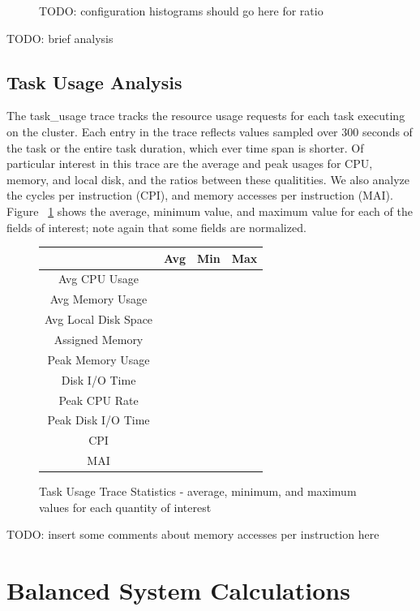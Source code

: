 \documentclass{sig-alternate}
\begin{document}
\begin{figure}
TODO: configuration histograms should go here for ratio
\end{figure}

TODO: brief analysis

\subsection{Task Usage Analysis}

The task\_usage trace tracks the resource usage requests for each task executing on the cluster.
Each entry in the trace reflects values sampled over 300 seconds of the task or the entire task duration, which ever time span is shorter.
Of particular interest in this trace are the average and peak usages for CPU, memory, and local disk, and the ratios between these qualitities.
We also analyze the cycles per instruction (CPI), and memory accesses per instruction (MAI).
Figure ~\ref{task_usage_stats} shows the average, minimum value, and maximum value for each of the fields of interest; note again that some fields are normalized.

\begin{figure}
\centering
\begin{tabular}{| c | c | c | c |} \hline
 & Avg & Min & Max \\ \hline
Avg CPU Usage & & & \\ \hline
Avg Memory Usage & & & \\ \hline
Avg Local Disk Space & & & \\ \hline
Assigned Memory & & & \\ \hline
Peak Memory Usage & & & \\ \hline
Disk I/O Time & & & \\ \hline
Peak CPU Rate & & & \\ \hline
Peak Disk I/O Time & & & \\ \hline
CPI & & & \\ \hline
MAI & & & \\ \hline
\end{tabular}
\caption{Task Usage Trace Statistics - average, minimum, and maximum values for each quantity of interest}
\label{task_usage_stats}
\end{figure}

TODO: insert some comments about memory accesses per instruction here

\section{Balanced System Calculations}
\end{document}
